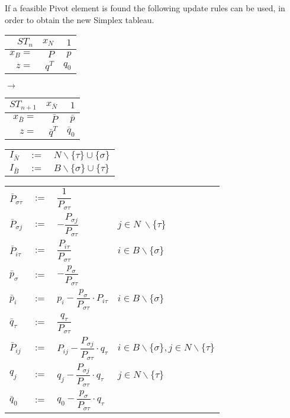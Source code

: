 \documentclass[a4paper, 11pt]{article}
\makeatletter
\renewenvironment{quotation}
{\list{}{\listparindent=1.5em
		\itemindent=0pt
		\parsep\z@ \@plus\p@}%
	\item\relax}
{\endlist}
\makeatother
\begin{document}
If a feasible Pivot element is found the following update rules can be used, in order to obtain the new Simplex tableau. \\
\begin{quotation}
	\begingroup
	\def\arraystretch{1.5}
	\begin{tabular}{r|r|r}
		$ST_n$&$x_N$&$1$\\
		\hline
		$x_B=$&$P$&$p$\\
		\hline
		$z=$&$q^T$&$q_0$
	\end{tabular}
	$\longrightarrow$
	\begin{tabular}{r|r|r}
		$ST_{n+1}$&$x_{\bar{N}}$&$1$\\
		\hline
		$x_{\bar{B}}=$&$\bar{P}$&$\bar{p}$\\
		\hline
		$z=$&$\bar{q}^T$&$\bar{q}_0$
	\end{tabular}
	\endgroup
\end{quotation}

\begin{quotation}
	\begingroup
	\def\arraystretch{1.5}
	\begin{tabular}{lrl}
		$I_{\bar{N}} $&$:=$&$ N \backslash\{ \tau \} \cup \{ \sigma \}$\\
		$I_{\bar{B}} $&$:=$&$ B \backslash\{ \sigma \} \cup \{ \tau \}$
	\end{tabular}
	\endgroup
\end{quotation}

\begin{quotation}
	\begingroup
	\def\arraystretch{2}
	\begin{tabular}{lrll}
		$ \bar{P}_{\sigma\tau}$&$:=$&$\dfrac{1}{P_{\sigma\tau}} $&\vspace{0.1cm}\\
		$\bar{P}_{\sigma j}$&$:=$&$ -\dfrac{P_{\sigma j}}{P_{\sigma\tau}}$& $ j\in N\ \backslash\{\tau\}$\vspace{0.1cm}\\
		$ \bar{P}_{i\tau}$&$ :=$ & $ \dfrac{P_{i\tau}}{P_{\sigma\tau}} $&$ i\in B\backslash \{\sigma\}$\\
		$ \bar{p}_\sigma $&$:=$&$ -\dfrac{p_\sigma}{P_{\sigma\tau}} $&\\
		$ \bar{p}_i $&$:=$&$ p_i - \dfrac{p_\sigma}{P_{\sigma\tau}}\cdot P_{i\tau}$&$i\in B\backslash\{ \sigma \}$\\
		$ \bar{q}_\tau $&$:=$&$ \dfrac{q_\tau}{P_{\sigma\tau}} $&\\
		$ \bar{P}_{ij} $&$ := $&$ P_{ij} - \dfrac{P_{\sigma j}}{P_{\sigma\tau}}\cdot q_\tau$&$ i\in B\backslash \{\sigma\}, j\in N\backslash\{\tau\} $\\
		$ q_j $&$ := $&$ q_j - \dfrac{P_{\sigma j}}{P_{\sigma\tau}}\cdot q_\tau $& $ j\in N\backslash\{\tau\} $\\
		$ \bar{q}_0 $&$:=$&$ q_0 - \dfrac{p_\sigma}{P_{\sigma\tau}}\cdot q_\tau $ 
	\end{tabular}
	\endgroup
\end{quotation}
\end{document}
